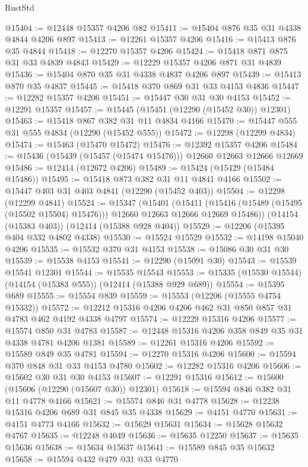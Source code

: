 \begin{lexlean}{RustStd}
\begin{coremodule}
{\begin{coremodule}
{{{{{{{{{{{{{{{{{{{{{{{{{{{{{{{{{{{{{{{{{{{{{{{{{{@15404 := @12448 @15357 @4206 @82
@15411 := @15404 @876 @35 @31 @4338 @4844 @4206 @897
@15413 := @12261 @15357 @4206
@15416 := @15413 @876 @35 @4844
@15418 := @12270 @15357 @4206
@15424 := @15418 @871 @875 @31 @33 @4839 @4843
@15429 := @12229 @15357 @4206 @871 @31 @4839
@15436 := @15404 @870 @35 @31 @4338 @4837 @4206 @897
@15439 := @15413 @870 @35 @4837
@15445 := @15418 @370 @869 @31 @33 @4153 @4836
@15447 := @12282 @15357 @4206
@15451 := @15447 @30 @31 @30 @4153
@15452 := @12291 @15357
@15457 := @15445 (@15451 (@12290 (@15452 @30)) @12301)
@15463 := @15418 @867 @382 @31 @11 @4834 @4166
@15470 := @15447 @555 @31 @555 @4834 (@12290 (@15452 @555))
@15472 := @12298 (@12299 @4834)
@15474 := @15463 (@15470 @15472)
@15476 := @12392 @15357 @4206
@15484 := @15436 (@15439 (@15457 (@15474 @15476))) @12660 @12663 @12666 @12669
@15486 := @12414 (@12672 @4206)
@15489 := @15424 (@15429 (@15484 @15486))
@15495 := @15418 @873 @382 @31 @11 @4841 @4166
@15502 := @15447 @403 @31 @403 @4841 (@12290 (@15452 @403))
@15504 := @12298 (@12299 @4841)
@15524 := @15347
    (@15401
      (@15411 (@15416 (@15489 (@15495 (@15502 @15504) @15476))) @12660 @12663 @12666 @12669 @15486))
    (@14154 (@15383 @403))
    (@12414 (@15388 @928 @404))
@15529 := @12206 (@15395 @404 @332 @4802 @4338)
@15530 := @15524 @15529
@15532 := @14198 @15040 @4206
@15535 := @15532 @370 @31 @4153
@15538 := @15086 @30 @31 @30
@15539 := @15538 @4153
@15541 := @12290 (@15091 @30)
@15543 := @15539 @15541 @12301
@15544 := @15535 @15543
@15553 := @15335 (@15530 @15544) (@14154 (@15383 @555)) (@12414 (@15388 @929 @689))
@15554 := @15395 @689
@15555 := @15554 @839
@15559 := @15553 (@12206 (@15555 @4754 @15332))
@15572 := @12212 @15316 @4206 @4206 @462 @31 @850 @857 @31 @4783 @462 @4192 @4338 @4797
@15574 := @12229 @15316 @4206
@15577 := @15574 @850 @31 @4783
@15587 := @12448 @15316 @4206 @358 @849 @35 @31 @4338 @4781 @4206 @1381
@15589 := @12261 @15316 @4206
@15592 := @15589 @849 @35 @4781
@15594 := @12270 @15316 @4206
@15600 := @15594 @370 @848 @31 @33 @4153 @4780
@15602 := @12282 @15316 @4206
@15606 := @15602 @30 @31 @30 @4153
@15607 := @12291 @15316
@15612 := @15600 (@15606 (@12290 (@15607 @30)) @12301)
@15618 := @15594 @846 @382 @31 @11 @4778 @4166
@15621 := @15574 @846 @31 @4778
@15628 := @12238 @15316 @4206 @689 @31 @845 @35 @4338
@15629 := @4151 @4770
@15631 := @4151 @4773 @4166
@15632 := @15629 @15631
@15634 := @15628 @15632 @4767
@15635 := @12248 @4049
@15636 := @15635 @12250
@15637 := @15635 @15636
@15638 := @15634 @15637
@15641 := @15589 @845 @35 @15632
@15658 := @15594
    @432
    @479
    @31
    @33
    @4770
}}}}}}}}}}}}}}}}}}}}}}}}}}}}}}}}}}}}}}}}}}}}}}}}}}
\end{coremodule}}
\end{coremodule}
\end{lexlean}
